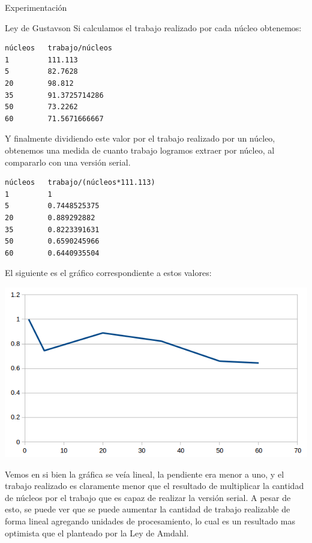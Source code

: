 \begin{section}{Experimentación}
\begin{subsection}{Ley de Gustavson}
Si calculamos el trabajo realizado por cada núcleo obtenemos:
\begin{verbatim}
núcleos   trabajo/núcleos
1         111.113
5         82.7628
20        98.812
35        91.3725714286
50        73.2262
60        71.5671666667
\end{verbatim}

Y finalmente dividiendo este valor por el trabajo realizado por un núcleo, obtenemos una medida de cuanto trabajo logramos extraer por núcleo, al compararlo con una versión serial.
\newpage
\begin{verbatim}
núcleos   trabajo/(núcleos*111.113)
1         1
5         0.7448525375
20        0.889292882
35        0.8223391631
50        0.6590245966
60        0.6440935504
\end{verbatim}
El siguiente es el gráfico correspondiente a estos valores:

\includegraphics{Gustavson2}

 Vemos en si bien la gráfica se veía lineal, la pendiente era menor a uno, y el trabajo realizado es claramente menor que el resultado de multiplicar la cantidad de núcleos por el trabajo que es capaz de realizar la versión serial.
 A pesar de esto, se puede ver que se puede aumentar la cantidad de trabajo realizable de forma lineal agregando unidades de procesamiento, lo cual es un resultado mas optimista que el planteado por la Ley de Amdahl.

\end{subsection}
\end{section}

